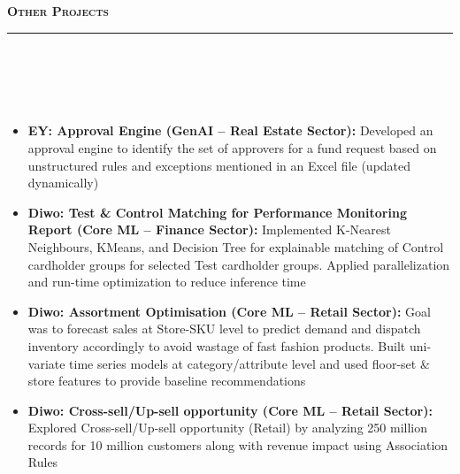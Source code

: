 \documentclass[a4paper,10pt]{article}
\newcommand{\lsep}{-0.5cm}
\newcommand{\resheading}[1]{{\small
        {
            \begin{minipage}
                {0.992\textwidth}\textbf{{\textsc{#1 \vphantom{p\^{E}} }}}
                \\[-0.3cm]
                \hrule
            \end{minipage}
            \\[-0.5cm]
        }
 }}
\begin{document}
\vspace{2pt}
\noindent
\resheading{\textbf{\large Other Projects}}\\[\lsep]
\\[-0.3cm]
\begin{itemize}


\item \textbf{EY: Approval Engine (GenAI -- Real Estate Sector): }{Developed an approval engine to identify the set of approvers for a fund request based on unstructured rules and exceptions mentioned in an Excel file (updated dynamically)}
\\ [-0.6cm]

\item \textbf{Diwo: Test \& Control Matching for Performance Monitoring Report (Core ML -- Finance Sector): }{Implemented K-Nearest Neighbours, KMeans, and Decision Tree for explainable matching of Control cardholder groups for selected Test cardholder groups. Applied parallelization and run-time optimization to reduce inference time}
\\ [-0.6cm]

\item \textbf{Diwo: Assortment Optimisation (Core ML -- Retail Sector): }{Goal was to forecast sales at Store-SKU level to predict demand and dispatch inventory accordingly to avoid wastage of fast fashion products. Built uni-variate time series models at category/attribute level and used floor-set \& store features to provide baseline recommendations 
}
\\ [-0.6cm]

\item \textbf{Diwo: Cross-sell/Up-sell opportunity (Core ML -- Retail Sector):} Explored Cross-sell/Up-sell opportunity (Retail) by analyzing 250 million records for 10 million customers along with revenue impact using Association Rules
\\ [-0.6cm]






\end{itemize}
\end{document}
